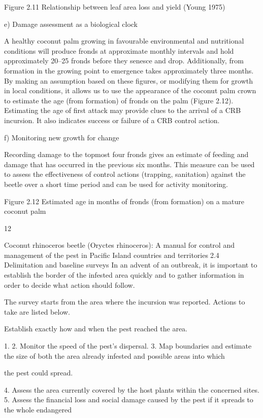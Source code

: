 \documentclass[twocolumn,letterpaper]{scrartcl}
\begin{document}

Figure 2.11  Relationship between leaf area loss and yield (Young 1975)

e)  Damage assessment as a biological clock

A healthy coconut palm growing in favourable environmental and nutritional conditions will produce fronds 
at  approximate  monthly  intervals  and  hold  approximately  20–25  fronds  before  they  senesce  and  drop. 
Additionally, from formation in the growing point to emergence takes approximately three months. By making 
an assumption based on these figures, or modifying them for growth in local conditions, it allows us to use the 
appearance of the coconut palm crown to estimate the age (from formation) of fronds on the palm (Figure 2.12). 
Estimating the age of first attack may provide clues to the arrival of a CRB incursion. It also indicates success or 
failure of a CRB control action.

f)  Monitoring new growth for change

Recording damage to the topmost four fronds gives an estimate of feeding and damage that has occurred 
in the previous six months. This measure can be used to assess the effectiveness of control actions (trapping, 
sanitation) against the beetle over a short time period and can be used for activity monitoring. 

Figure 2.12  Estimated age in months of fronds (from formation) on a mature coconut palm

12

Coconut rhinoceros beetle (Oryctes rhinoceros): A manual for control and management of the pest in Pacific Island countries and territories2.4  Delimitation and baseline surveys
In an advent of an outbreak, it is important to establish the border of the infested area quickly and to gather 
information in order to decide what action should follow.

The survey starts from the area where the incursion was reported. Actions to take are listed below.

Establish exactly how and when the pest reached the area.

1. 
2.  Monitor the speed of the pest’s dispersal.
3.  Map boundaries and estimate the size of both the area already infested and possible areas into which 

the pest could spread.

4.  Assess the area currently covered by the host plants within the concerned sites.
5.  Assess the financial loss and social damage caused by the pest if it spreads to the whole endangered 
\end{document}
